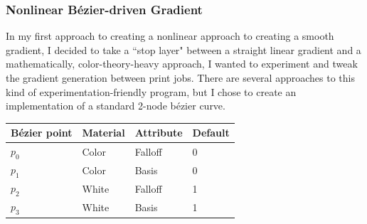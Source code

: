 \documentclass{article}
\begin{document}
\begin{multicols}{2}
\subsubsection{Nonlinear B\'ezier-driven Gradient}

In my first approach to creating a nonlinear approach to creating a smooth gradient, I decided to take a ``stop layer" between a straight linear gradient and a mathematically, color-theory-heavy approach, I wanted to experiment and tweak the gradient generation between print jobs. There are several approaches to this kind of experimentation-friendly program, but I chose to create an implementation of a standard 2-node b\'ezier curve.
\\

\noindent
\begin{tabular}{|p{}||p{}|p{}|p{}|}
    \hline
    B\'ezier point & Material & Attribute & Default \\
    \hline
    $p_0$ & Color & Falloff & 0  \\
    $p_1$ & Color & Basis & 0  \\
    $p_2$ & White & Falloff & 1  \\
    $p_3$ & White & Basis & 1  \\
    \hline
\end{tabular}


\end{multicols}
\end{document}
